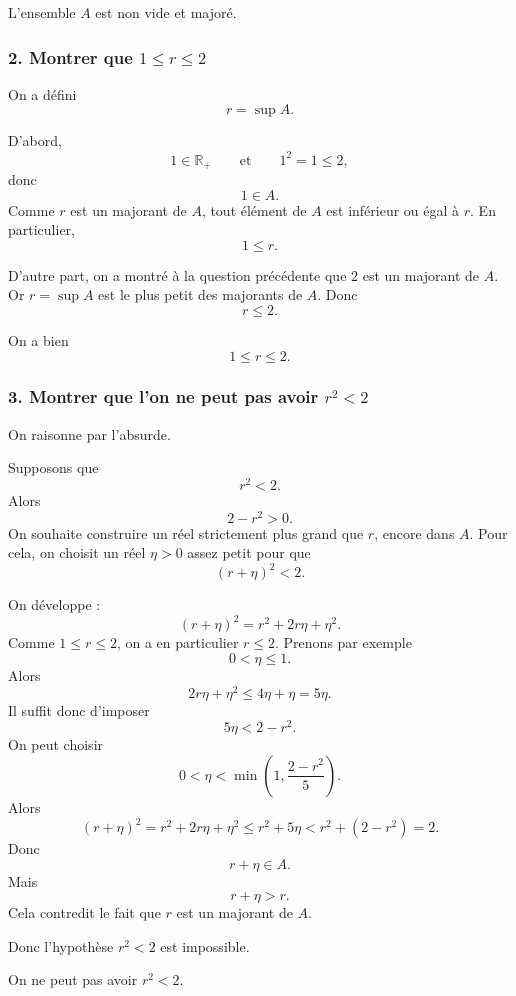 \documentclass[11pt,a4paper]{article}
\newcommand{\R}{\mathbb{R}}
\begin{document}
\begin{resultatbox}
L'ensemble \(A\) est non vide et majoré.
\end{resultatbox}


\subsubsection*{2. Montrer que \(1\leq r\leq 2\)}

On a défini
\[
r=\sup A.
\]

D'abord,
\[
1\in\R_+
\qquad\text{et}\qquad
1^2=1\leq 2,
\]
donc
\[
1\in A.
\]
Comme \(r\) est un majorant de \(A\), tout élément de \(A\) est inférieur ou égal à \(r\). En particulier,
\[
1\leq r.
\]

D'autre part, on a montré à la question précédente que \(2\) est un majorant de \(A\). Or \(r=\sup A\) est le plus petit des majorants de \(A\). Donc
\[
r\leq 2.
\]

\begin{resultatbox}
On a bien
\[
1\leq r\leq 2.
\]
\end{resultatbox}


\subsubsection*{3. Montrer que l'on ne peut pas avoir \(r^2<2\)}

On raisonne par l'absurde.

Supposons que
\[
r^2<2.
\]
Alors
\[
2-r^2>0.
\]
On souhaite construire un réel strictement plus grand que \(r\), encore dans \(A\). Pour cela, on choisit un réel \(\eta>0\) assez petit pour que
\[
(r+\eta)^2<2.
\]

On développe :
\[
(r+\eta)^2=r^2+2r\eta+\eta^2.
\]
Comme \(1\leq r\leq 2\), on a en particulier \(r\leq 2\). Prenons par exemple
\[
0<\eta\leq 1.
\]
Alors
\[
2r\eta+\eta^2\leq 4\eta+\eta=5\eta.
\]
Il suffit donc d'imposer
\[
5\eta<2-r^2.
\]
On peut choisir
\[
0<\eta<\min\left(1,\frac{2-r^2}{5}\right).
\]
Alors
\[
(r+\eta)^2
=
r^2+2r\eta+\eta^2
\leq r^2+5\eta
<r^2+(2-r^2)=2.
\]
Donc
\[
r+\eta\in A.
\]
Mais
\[
r+\eta>r.
\]
Cela contredit le fait que \(r\) est un majorant de \(A\).

Donc l'hypothèse \(r^2<2\) est impossible.

\begin{resultatbox}
On ne peut pas avoir \(r^2<2\).
\end{resultatbox}
\end{document}
